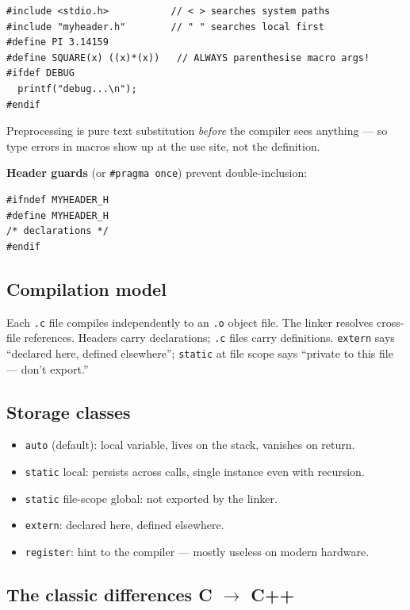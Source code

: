 \documentclass[11pt,a4paper]{article}
\begin{document}
\begin{lstlisting}
#include <stdio.h>           // < > searches system paths
#include "myheader.h"        // " " searches local first
#define PI 3.14159
#define SQUARE(x) ((x)*(x))   // ALWAYS parenthesise macro args!
#ifdef DEBUG
  printf("debug...\n");
#endif
\end{lstlisting}

Preprocessing is pure text substitution \emph{before} the compiler sees anything --- so type errors in macros show up at the use site, not the definition.

\textbf{Header guards} (or \verb|#pragma once|) prevent double-inclusion:
\begin{lstlisting}
#ifndef MYHEADER_H
#define MYHEADER_H
/* declarations */
#endif
\end{lstlisting}

\subsection{Compilation model}

Each \texttt{.c} file compiles independently to an \texttt{.o} object file. The linker resolves cross-file references. Headers carry declarations; \texttt{.c} files carry definitions. \verb|extern| says ``declared here, defined elsewhere''; \verb|static| at file scope says ``private to this file --- don't export.''

\subsection{Storage classes}

\begin{itemize}[leftmargin=*,itemsep=1pt]
  \item \verb|auto| (default): local variable, lives on the stack, vanishes on return.
  \item \verb|static| local: persists across calls, single instance even with recursion.
  \item \verb|static| file-scope global: not exported by the linker.
  \item \verb|extern|: declared here, defined elsewhere.
  \item \verb|register|: hint to the compiler --- mostly useless on modern hardware.
\end{itemize}

\subsection{The classic differences C $\rightarrow$ C++}
\end{document}
